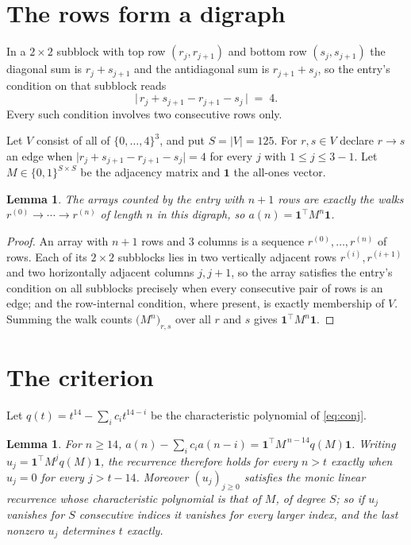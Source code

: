 \documentclass[11pt,a4paper]{article}
\theoremstyle{plain}
\newtheorem{lemma}[theorem]{Lemma}
\theoremstyle{definition}
\begin{document}
\section{The rows form a digraph}

In a $2\times2$ subblock with top row $(r_j,r_{j+1})$ and bottom row $(s_j,s_{j+1})$ the
diagonal sum is $r_j+s_{j+1}$ and the antidiagonal sum is $r_{j+1}+s_j$, so the entry's
condition on that subblock reads
\[
\bigl|\,r_j+s_{j+1}-r_{j+1}-s_j\,\bigr|\;=\;4.
\]
Every such condition involves two consecutive rows only.

Let $V$ consist of all of $\{0,\dots,4\}^{3}$, and put $S=|V|=125$. For $r,s\in V$ declare $r\to s$ an edge
when $\bigl|r_j+s_{j+1}-r_{j+1}-s_j\bigr|=4$ for every $j$ with
$1\le j\le3-1$. Let $M\in\{0,1\}^{S\times S}$ be the adjacency matrix and $\mathbf{1}$
the all-ones vector.

\begin{lemma}\label{lem:walk}
The arrays counted by the entry with $n+1$ rows are exactly the walks
$r^{(0)}\to\cdots\to r^{(n)}$ of length $n$ in this digraph, so
$a(n)=\mathbf{1}^{\!\top}M^{n}\mathbf{1}$.
\end{lemma}

\begin{proof}
An array with $n+1$ rows and $3$ columns is a sequence $r^{(0)},\dots,r^{(n)}$ of
rows. Each of its $2\times2$ subblocks lies in two vertically adjacent rows
$r^{(i)},r^{(i+1)}$ and two horizontally adjacent columns $j,j+1$, so the array satisfies
the entry's condition on all subblocks precisely when every consecutive pair of rows is an
edge; and the row-internal condition, where present, is exactly membership of $V$. Summing
the walk counts $\bigl(M^{n}\bigr)_{r,s}$ over all $r$ and $s$ gives
$\mathbf{1}^{\!\top}M^{n}\mathbf{1}$.
\end{proof}

\section{The criterion}

Let $q(t)=t^{14}-\sum_i c_i t^{14-i}$ be the characteristic polynomial of
\eqref{eq:conj}.

\begin{lemma}\label{lem:crit}
For $n\ge14$,
$a(n)-\sum_i c_i a(n-i)=\mathbf{1}^{\!\top}M^{\,n-14}q(M)\mathbf{1}$. Writing
$u_j=\mathbf{1}^{\!\top}M^{j}q(M)\mathbf{1}$, the recurrence therefore holds for every
$n>t$ exactly when $u_j=0$ for every $j>t-14$. Moreover $(u_j)_{j\ge0}$ satisfies the
monic linear recurrence whose characteristic polynomial is that of $M$, of degree $S$; so
if $u_j$ vanishes for $S$ consecutive indices it vanishes for every larger index, and the
last nonzero $u_j$ determines $t$ exactly.
\end{lemma}
\end{document}
